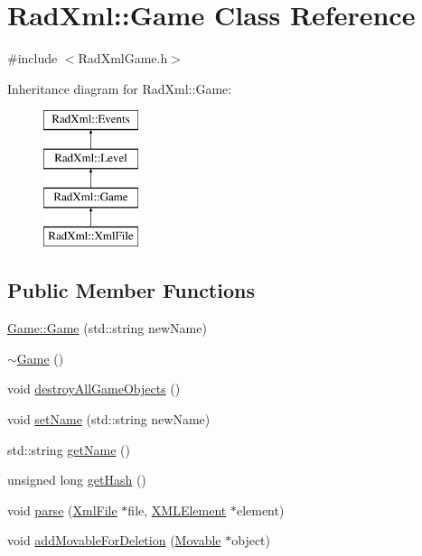 \hypertarget{class_rad_xml_1_1_game}{\section{Rad\-Xml\-:\-:Game Class Reference}
\label{class_rad_xml_1_1_game}
}


{\ttfamily \#include $<$Rad\-Xml\-Game.\-h$>$}

Inheritance diagram for Rad\-Xml\-:\-:Game\-:\begin{figure}[H]
\begin{center}
\leavevmode
\includegraphics[height=4.000000cm]{class_rad_xml_1_1_game}
\end{center}
\end{figure}
\subsection*{Public Member Functions}
\begin{DoxyCompactItemize}
\item 
\hyperlink{class_rad_xml_1_1_game_ad128bd70c1b5192043c265cb02daf188}{Game\-::\-Game} (std\-::string new\-Name)
\item 
\hyperlink{class_rad_xml_1_1_game_a672c06cb1bbad3da1c6f89c83cce46ef}{$\sim$\-Game} ()
\item 
void \hyperlink{class_rad_xml_1_1_game_ae4191ebc6092a4041d4a1c96b95a1e3c}{destroy\-All\-Game\-Objects} ()
\item 
void \hyperlink{class_rad_xml_1_1_game_a41e38a48bac32c76e19614f6ee908bdd}{set\-Name} (std\-::string new\-Name)
\item 
std\-::string \hyperlink{class_rad_xml_1_1_game_a3dc609b2e608a141472a2509e6e39d51}{get\-Name} ()
\item 
unsigned long \hyperlink{class_rad_xml_1_1_game_a1bdee17dc5f4ac9f66786f2b170b4183}{get\-Hash} ()
\item 
void \hyperlink{class_rad_xml_1_1_game_adb846e54106c1b19fbb43e072cf84309}{parse} (\hyperlink{class_rad_xml_1_1_xml_file}{Xml\-File} $\ast$file, \hyperlink{class_x_m_l_element}{X\-M\-L\-Element} $\ast$element)
\item 
void \hyperlink{class_rad_xml_1_1_game_ae2bec8d6b22ec8c0155171e3a28ad549}{add\-Movable\-For\-Deletion} (\hyperlink{class_rad_xml_1_1_movable}{Movable} $\ast$object)
\end{DoxyCompactItemize}
